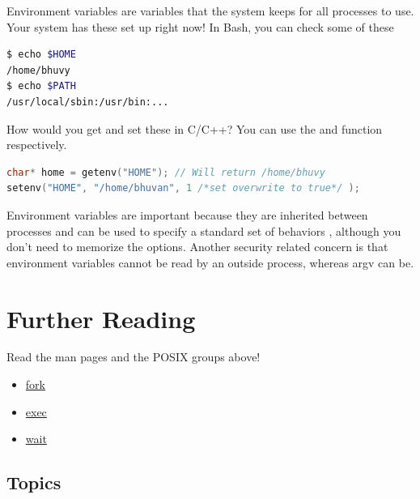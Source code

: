 Environment variables are variables that the system keeps for all processes to use.
Your system has these set up right now!
In Bash, you can check some of these

\begin{lstlisting}[language=bash]
$ echo $HOME
/home/bhuvy
$ echo $PATH
/usr/local/sbin:/usr/bin:...
\end{lstlisting}

How would you get and set these in C/C++? You can use the  and  function respectively.

\begin{lstlisting}[language=C]
char* home = getenv("HOME"); // Will return /home/bhuvy
setenv("HOME", "/home/bhuvan", 1 /*set overwrite to true*/ );
\end{lstlisting}

Environment variables are important because they are inherited between processes and can be used to specify a standard set of behaviors \cite{env_std_2018}, although you don't need to memorize the options.
Another security related concern is that environment variables cannot be read by an outside process, whereas argv can be.

\section{Further Reading}

Read the man pages and the POSIX groups above!

\begin{itemize}
\item \href{http://man7.org/linux/man-pages/man2/fork.2.html}{fork}
\item \href{http://man7.org/linux/man-pages/man3/exec.3.html}{exec}
\item \href{http://man7.org/linux/man-pages/man2/wait.2.html}{wait}
\end{itemize}

\subsection{Topics}

